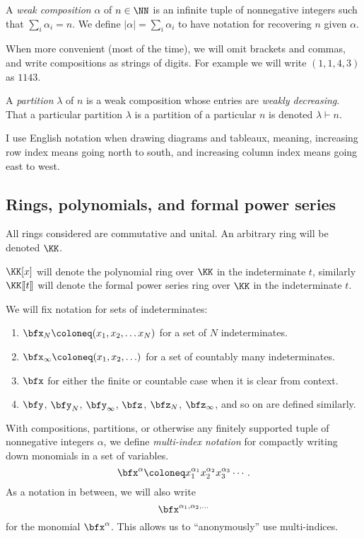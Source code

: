 \documentclass{article}
\newcommand{\fps}[2]{#1 [\kern-1.2pt[ {#2} ]\kern-1.2pt]}
\newcommand{\pring}[2]{#1 [ {#2} ]}
\begin{document}
A \textit{weak composition} $\alpha$ of $n \in \NN$ is an infinite tuple of nonnegative integers 
such that $\sum_i \alpha_i = n$. 
We define $|\alpha| = \sum_i \alpha_i$ to have notation for recovering $n$ given $\alpha$.

When more convenient (most of the time), we will omit brackets and commas, and write compositions as strings of digits. For example we will write $(1,1,4,3)$ as $1143$.

A \textit{partition} $\lambda$ of $n$ is a weak composition whose entries are \textit{weakly decreasing}. 
That a particular partition $\lambda$ is a partition of a particular $n$ is denoted $\lambda \vdash n$. 

I use English notation when drawing diagrams and tableaux, meaning, increasing row index means going north to south, and increasing column index means going east to west.

\subsection*{Rings, polynomials, and formal power series}

All rings considered are commutative and unital. An arbitrary ring will be denoted $\KK$. 

$\pring{\KK}{x}$ will denote the polynomial ring over $\KK$ in the indeterminate $t$, similarly $\fps{\KK}{t}$ will denote the formal power series ring over $\KK$ in the indeterminate $t$.

We will fix notation for sets of indeterminates:

\begin{enumerate}[label=(\alph*)]
    \item $\bfx_N \coloneq (x_1, x_2, \ldots x_N)$ for a set of $N$ indeterminates.
    \item $\bfx_\infty \coloneq (x_1, x_2, \ldots)$ for a set of countably many indeterminates.
    \item $\bfx$ for either the finite or countable case when it is clear from context.
    \item $\bfy$, $\bfy_N$, $\bfy_\infty$, $\bfz$, $\bfz_N$, $\bfz_\infty$, and so on are defined similarly.
\end{enumerate}

With compositions, partitions, or otherwise any finitely supported tuple of nonnegative integers $\alpha$, we define \textit{multi-index notation} for compactly writing down monomials in a set of variables.
\[
    \bfx^\alpha
    \coloneq
    x_1^{\alpha_1}x_2^{\alpha_2}x_3^{\alpha_3}\cdots.
\]
As a notation in between, we will also write
\[
    \bfx^{\alpha_1,\alpha_2,\ldots}
\]
for the monomial $\bfx^\alpha$.
This allows us to ``anonymously'' use multi-indices.
\end{document}
